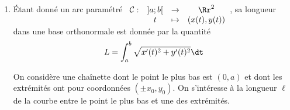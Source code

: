 {\begin{enumerate}
   	On considère les courbes paramétrées $C_1 \colon \left\{
   	\begin{array}{l}
   	x(t) = \cos(t)\\
   	y(t) = \sin(t)
   	\end{array}
   	\right.$ et $C_2 \colon \left\{
   	\begin{array}{l}
   	x(t) = \ch(t)\\
   	y(t) = \sh(t)
   	\end{array}
   	\right.$
   	

   \item 		\'Etant donné un arc paramétré $\begin{array}[t]{cccc}
   \mathcal{C} :&\mathcal ]a;b[ &\rightarrow&\Rr^2\\
   &t&\mapsto&(x(t),y(t))
   \end{array}$, sa longueur dans une base orthonormale est donnée par la quantité 
   $$L = \int_a^b \sqrt{x'(t)^2 + y'(t)^2} \dt$$
   
   	On considère une chaînette dont le point le plus bas est $(0,a)$ et dont les extrémités ont pour coordonnées $(\pm x_0,y_0)$. On s'intéresse à la longueur $\ell$ de la courbe entre le point le plus bas et une des extrémités. 


\end{enumerate}}
